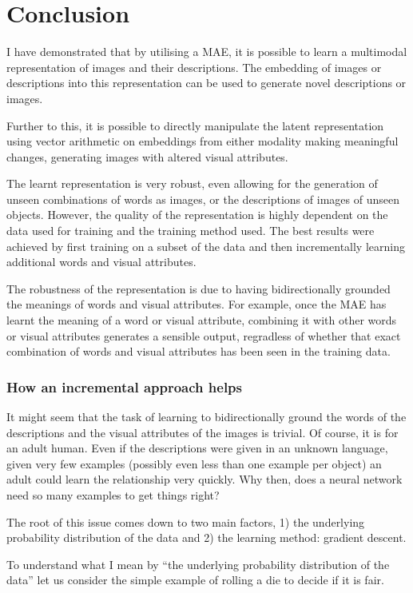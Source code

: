 \section{Conclusion}
I have demonstrated that by utilising a MAE, it is possible to learn a multimodal representation of images and their descriptions. The embedding of images or descriptions into this representation can be used to generate novel descriptions or images.

Further to this, it is possible to directly manipulate the latent representation using vector arithmetic on embeddings from either modality making meaningful changes, generating images with altered visual attributes.

The learnt representation is very robust, even allowing for the generation of unseen combinations of words as images, or the descriptions of images of unseen objects. However, the quality of the representation is highly dependent on the data used for training and the training method used. The best results were achieved by first training on a subset of the data and then incrementally learning additional words and visual attributes.

The robustness of the representation is due to having bidirectionally grounded the meanings of words and visual attributes. For example, once the MAE has learnt the meaning of a word or visual attribute, combining it with other words or visual attributes generates a sensible output, regradless of whether that exact combination of words and visual attributes has been seen in the training data.

\subsubsection{How an incremental approach helps}
It might seem that the task of learning to bidirectionally ground the words of the descriptions and the visual attributes of the images is trivial. Of course, it is for an adult human. Even if the descriptions were given in an unknown language, given very few examples (possibly even less than one example per object) an adult could learn the relationship very quickly. Why then, does a neural network need so many examples to get things right?

The root of this issue comes down to two main factors, 1) the underlying probability distribution of the data and 2) the learning method: gradient descent.

To understand what I mean by ``the underlying probability distribution of the data'' let us consider the simple example of rolling a die to decide if it is fair.

